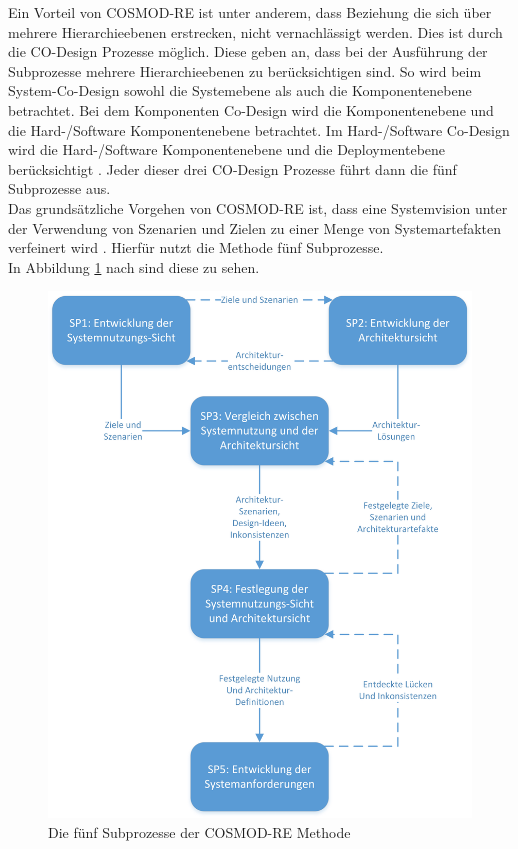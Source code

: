 Ein Vorteil von COSMOD-RE ist unter anderem, dass Beziehung die sich \"uber mehrere Hierarchieebenen erstrecken, nicht vernachl\"assigt werden. Dies ist durch die CO-Design Prozesse m\"oglich. Diese geben an, dass bei der Ausf\"uhrung der Subprozesse mehrere Hierarchieebenen zu ber\"ucksichtigen sind. So wird beim System-Co-Design sowohl die Systemebene als auch die Komponentenebene betrachtet. Bei dem Komponenten Co-Design wird die Komponentenebene und die Hard-/Software Komponentenebene betrachtet. Im Hard-/Software Co-Design wird die Hard-/Software Komponentenebene und die Deploymentebene ber\"ucksichtigt \cite{Poh02}. Jeder dieser drei CO-Design Prozesse f\"uhrt dann die f\"unf Subprozesse aus.\\ 

Das grunds\"atzliche Vorgehen von COSMOD-RE ist, dass eine Systemvision unter der Verwendung von Szenarien und Zielen zu einer Menge von Systemartefakten verfeinert wird \cite{Poh01}. Hierf\"ur nutzt die Methode f\"unf Subprozesse. \\

In Abbildung \ref{pro5} nach \cite{Poh01} sind diese zu sehen. \\

\begin{figure}[h]
	\centering
	\includegraphics[scale=0.65]{COSMODRE5prozesse.jpg} 
	\caption{Die f\"unf Subprozesse der COSMOD-RE Methode}\label{pro5}
\end{figure}

